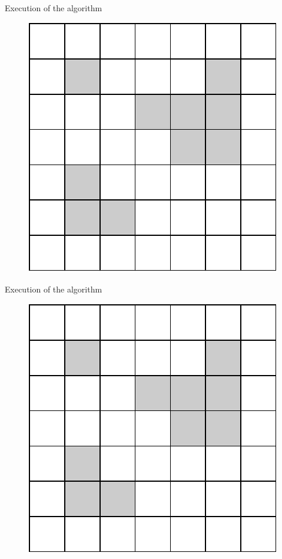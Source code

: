 \documentclass[10pt]{beamer}
\begin{document}
\begin{frame}{Execution of the algorithm}
    \begin{figure}
        \centering
        \includegraphics{figures/running-example/running-ex-init.pdf}
    \end{figure}
\end{frame}

\begin{frame}{Execution of the algorithm}
    \begin{figure}
        \centering
        \includegraphics{figures/running-example/running-ex-init.pdf}
    \end{figure}
\end{frame}
\end{document}
